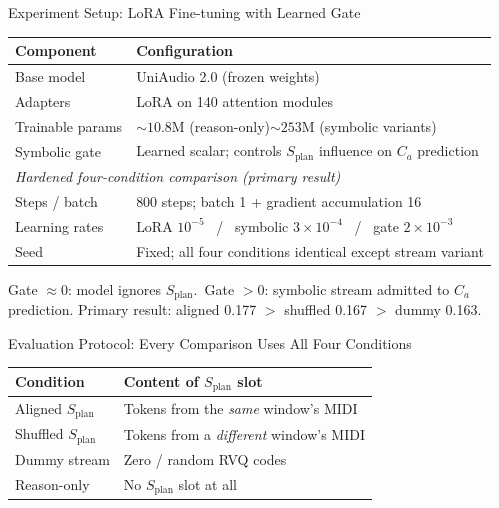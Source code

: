 \documentclass[aspectratio=169,11pt]{beamer}
\newcommand{\splan}{$S_{\mathrm{plan}}$}
\begin{document}
\begin{frame}{Experiment Setup: LoRA Fine-tuning with Learned Gate}

  {\small
  \begin{tabular}{p{3.5cm}p{8.5cm}}
    \toprule
    \textbf{Component} & \textbf{Configuration} \\
    \midrule
    Base model & UniAudio 2.0 (frozen weights) \\
    Adapters & LoRA on 140 attention modules \\
    Trainable params & ${\sim}10.8$M (reason-only)\quad${\sim}253$M (symbolic variants) \\
    Symbolic gate & Learned scalar; controls \splan{} influence on $C_a$ prediction \\
    \midrule
    \multicolumn{2}{l}{\textit{Hardened four-condition comparison (primary result)}} \\
    \midrule
    Steps / batch & 800 steps; batch 1 + gradient accumulation 16 \\
    Learning rates & LoRA $10^{-5}$ \ / \ symbolic $3\!\times\!10^{-4}$ \ / \ gate $2\!\times\!10^{-3}$ \\
    Seed & Fixed; all four conditions identical except stream variant \\
    \bottomrule
  \end{tabular}}

  \smallskip
  \smallskip
  {\footnotesize\color{Muted} Gate $\approx 0$: model ignores \splan{}.\ Gate $> 0$: symbolic stream admitted to $C_a$ prediction.
  Primary result: aligned 0.177 $>$ shuffled 0.167 $>$ dummy 0.163.}
\end{frame}

\begin{frame}{Evaluation Protocol: Every Comparison Uses All Four Conditions}

  {\small
  \begin{tabular}{p{3.0cm}p{8.8cm}}
    \toprule
    \textbf{Condition} & \textbf{Content of \splan{} slot} \\
    \midrule
    Aligned \splan{}  & Tokens from the \emph{same} window's MIDI \\[4pt]
    Shuffled \splan{} & Tokens from a \emph{different} window's MIDI \\[4pt]
    Dummy stream      & Zero / random RVQ codes \\[4pt]
    Reason-only       & No \splan{} slot at all \\
    \bottomrule
  \end{tabular}}
\end{frame}
\end{document}
